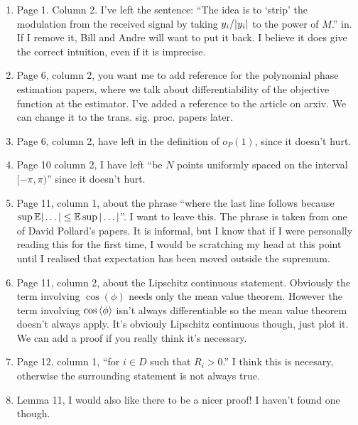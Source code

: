 \documentclass[a4paper,12pt]{article}
\begin{document}
\begin{enumerate}
\item Page 1. Column 2. I've left the sentence: ``The idea is to `strip' the modulation from the received signal by taking $y_i / {\left\vert y_i \right\vert}$ to the power of $M$.'' in.  If I remove it, Bill and Andre will want to put it back.  I believe it does give the correct intuition, even if it is imprecise.
\item Page 6, column 2, you want me to add reference for the polynomial phase estimation papers, where we talk about differentiability of the objective function at the estimator.  I've added a reference to the article on arxiv.  We can change it to the trans. sig. proc. papers later.
\item Page 6, column 2, have left in the definition of $o_P(1)$, since it doesn't hurt.
\item Page 10 column 2, I have left ``be $N$ points uniformly spaced on the interval $[-\pi, \pi)$'' since it doesn't hurt.
\item Page 11, column 1, about the phrase ``where the last line follows because $\sup {\mathbb E}\vert \dots\vert \leq {\mathbb E} \sup \vert \dots \vert$''.  I want to leave this.  The phrase is taken from one of David Pollard's papers.  It is informal, but I know that if I were personally reading this for the first time, I would be scratching my head at this point until I realised that expectation has been moved outside the supremum.
\item Page 11, column 2, about the Lipschitz continuous statement.  Obviously the term involving $\cos(\phi)$ needs only the mean value theorem.  However the term involving $\cos\left\langle \phi \right\rangle$ isn't always differentiable so the mean value theorem doesn't always apply.  It's obviouly Lipschitz continuous though, just plot it.  We can add a proof if you really think it's necessary.
\item Page 12, column 1, ``for $i \in D$ such that $R_i > 0$.'' I think this is necesary, otherwise the surrounding statement is not always true.
\item Lemma 11, I would also like there to be a nicer proof!  I haven't found one though.
\end{enumerate}
\end{document}
